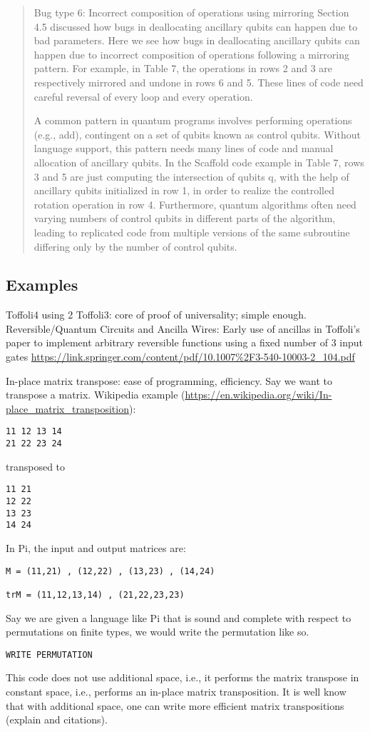 \documentclass[sigplan,10pt,review,anonymous]{acmart}
\begin{document}
\begin{quote}

  Bug type 6: Incorrect composition of operations using mirroring Section 4.5 discussed how bugs in deallocating ancillary qubits can happen due to bad parameters. Here we see how bugs in deallocating ancillary qubits can happen due to incorrect composition of operations following a mirroring pattern. For example, in Table 7, the operations in rows 2 and 3 are respectively mirrored and undone in rows 6 and 5. These lines of code need careful reversal of every loop and every operation.

  A common pattern in quantum programs involves performing operations (e.g., add), contingent on a set of qubits known as control qubits. Without language support, this pattern needs many lines of code and manual allocation of ancillary qubits. In the Scaffold code example in Table 7, rows 3 and 5 are just computing the intersection of qubits q, with the help of ancillary qubits initialized in row 1, in order to realize the controlled rotation operation in row 4. Furthermore, quantum algorithms often need varying numbers of control qubits in different parts of the algorithm, leading to replicated code from multiple versions of the same subroutine differing only by the number of control qubits.

\end{quote}

\subsection{Examples}
 
Toffoli4 using 2 Toffoli3: core of proof of universality; simple
enough. Reversible/Quantum Circuits and Ancilla Wires: Early use of
ancillas in Toffoli's paper to implement arbitrary reversible
functions using a fixed number of 3 input gates
\url{https://link.springer.com/content/pdf/10.1007%2F3-540-10003-2_104.pdf}

In-place matrix transpose: ease of programming, efficiency. Say we
want to transpose a matrix. Wikipedia example
(\url{https://en.wikipedia.org/wiki/In-place_matrix_transposition}):
\begin{verbatim}
11 12 13 14 
21 22 23 24 
\end{verbatim}
transposed to
\begin{verbatim}
11 21
12 22
13 23
14 24
\end{verbatim}
In Pi, the input and output matrices are:
\begin{verbatim}
M = (11,21) , (12,22) , (13,23) , (14,24) 

trM = (11,12,13,14) , (21,22,23,23) 
\end{verbatim}
Say we are given a language like Pi that is sound and complete with
respect to permutations on finite types, we would write the
permutation like so.
\begin{verbatim}
WRITE PERMUTATION
\end{verbatim}
This code does not use additional space, i.e., it performs the matrix
transpose in constant space, i.e., performs an in-place matrix
transposition. It is well know that with additional space, one can
write more efficient matrix transpositions (explain and citations).
\end{document}
